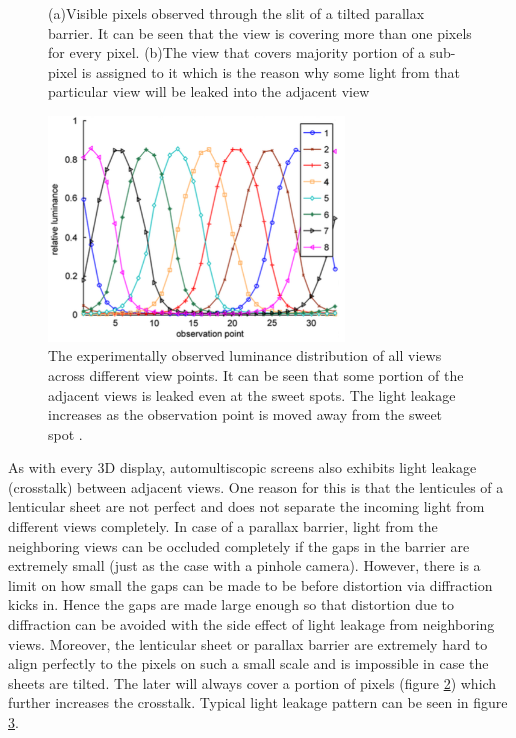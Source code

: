 \begin{figure}[htbp]
\begin{subfigure}[b]{0.4\textwidth}
        \caption{ }\label{fig:tilted_sheet_views}
    \end{subfigure}

    \caption{(a)Visible pixels observed through the slit of a tilted parallax barrier. It can be seen that the view is covering more than one pixels for every pixel. (b)The view that covers majority portion of a sub-pixel is assigned to it which is the reason why some light from that particular view will be leaked into the adjacent view \cite{wang2014improved}\label{fig:automultiscopic_sheet}}
\end{figure}
\begin{figure}
\centering
    \includegraphics[width=0.7\textwidth]{./Template_Figures/Gaussians}
    \caption{ The experimentally observed luminance distribution of all views across different view points. It can be seen that some portion of the adjacent views is leaked even at the sweet spots. The light leakage increases as the observation point is moved away from the sweet spot \cite{woods2012crosstalk}.\label{fig:gaussians}}
\end{figure}

As with every 3D display, automultiscopic screens also exhibits light leakage (crosstalk) between adjacent views. One reason for this is that the lenticules of a lenticular sheet are not perfect and does not separate the incoming light from different views completely. In case of a parallax barrier, light from the neighboring views can be occluded completely if the gaps in the barrier are extremely small (just as the case with a pinhole camera). However, there is a limit on how small the gaps can be made to be before distortion via diffraction kicks in. Hence the gaps are made large enough so that distortion due to diffraction can be avoided with the side effect of light leakage from neighboring views. Moreover, the lenticular sheet or parallax barrier are extremely hard to align perfectly to the pixels on such a small scale and is impossible in case the sheets are tilted. The later will always cover a portion of pixels (figure \ref{fig:automultiscopic_sheet}) which further increases the crosstalk. Typical light leakage pattern can be seen in figure \ref{fig:gaussians}.


